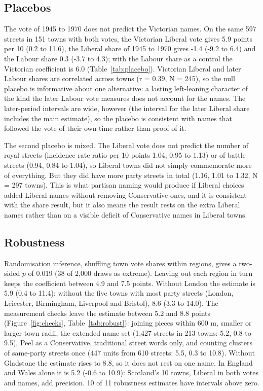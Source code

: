 \documentclass[11pt,a4paper]{article}
\begin{document}
\subsection{Placebos}
The vote of 1945 to 1970 does not predict the Victorian names. On the same 597 streets in 151 towns with both votes, the Victorian Liberal vote gives 5.9 points per 10 (0.2 to 11.6), the Liberal share of 1945 to 1970 gives -1.4 (-9.2 to 6.4) and the Labour share 0.3 (-3.7 to 4.3); with the Labour share as a control the Victorian coefficient is 6.0 (Table~\ref{tab:placebo}). Victorian Liberal and later Labour shares are correlated across towns (r = 0.39, N = 245), so the null placebo is informative about one alternative: a lasting left-leaning character of the kind the later Labour vote measures does not account for the names. The later-period intervals are wide, however (the interval for the later Liberal share includes the main estimate), so the placebo is consistent with names that followed the vote of their own time rather than proof of it.

The second placebo is mixed. The Liberal vote does not predict the number of royal streets (incidence rate ratio per 10 points 1.04, 0.95 to 1.13) or of battle streets (0.94, 0.84 to 1.04), so Liberal towns did not simply commemorate more of everything. But they did have more party streets in total (1.16, 1.01 to 1.32, N = 297 towns). This is what partisan naming would produce if Liberal choices added Liberal names without removing Conservative ones, and it is consistent with the share result, but it also means the result rests on the extra Liberal names rather than on a visible deficit of Conservative names in Liberal towns.

\subsection{Robustness}
Randomisation inference, shuffling town vote shares within regions, gives a two-sided $p$ of 0.019 (38 of 2,000 draws as extreme). Leaving out each region in turn keeps the coefficient between 4.9 and 7.5 points. Without London the estimate is 5.9 (0.4 to 11.4); without the five towns with most party streets (London, Leicester, Birmingham, Liverpool and Bristol), 8.6 (3.3 to 14.0). The measurement checks leave the estimate between 5.2 and 8.8 points (Figure~\ref{fig:checks}, Table~\ref{tab:robust}): joining pieces within 600 m, smaller or larger town radii, the extended name set (1,427 streets in 213 towns: 5.2, 0.8 to 9.5), Peel as a Conservative, traditional street words only, and counting clusters of same-party streets once (447 units from 610 streets: 5.5, 0.3 to 10.8). Without Gladstone the estimate rises to 8.8, so it does not rest on one name. In England and Wales alone it is 5.2 (-0.6 to 10.9): Scotland's 10 towns, Liberal in both votes and names, add precision. 10 of 11 robustness estimates have intervals above zero.
\end{document}
